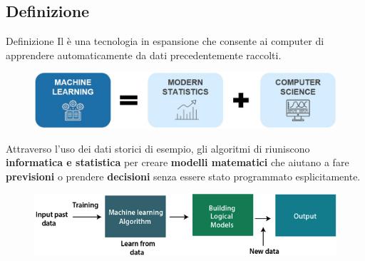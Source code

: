 \subsection[Definizione]{Definizione}
\begin{frame}
	
	\begin{block}{Definizione}
		Il \mlbold è una tecnologia in espansione che consente ai computer di apprendere automaticamente da dati precedentemente raccolti.
		
		\begin{figure}[!htbp]
			\centering
			\includegraphics[width=0.6\linewidth]{images/intro/machine_learning_definition.png}
		\end{figure}
		
		Attraverso l'uso dei dati storici di esempio, gli algoritmi di \ml riuniscono \textbf{informatica e statistica} per creare \textbf{modelli matematici} che aiutano a fare \textbf{previsioni} o prendere \textbf{decisioni} senza essere stato programmato esplicitamente.
		
		\begin{figure}[!htbp]
			\centering
			\includegraphics[width=0.73\linewidth]{images/intro/introduction-to-machine-learning.png}
		\end{figure}
	\end{block}
	
\end{frame}


